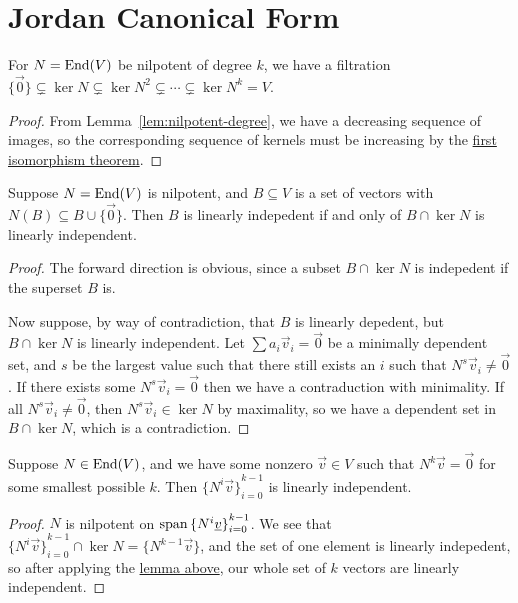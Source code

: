 \section{Jordan Canonical Form}

\begin{lemma}
    For \(N = \operatorname{End}(V)\) be nilpotent of degree \(k\),
    we have a filtration
    \(\{\vec{0}\} \subsetneq \ker N \subsetneq \ker N^2 \subsetneq \cdots \subsetneq \ker N^k = V\).
\end{lemma}
\begin{proof}
    From Lemma~\ref{lem:nilpotent-degree},
    we have a decreasing sequence of images,
    so the corresponding sequence of kernels must be increasing
    by the \hyperref[thm:iso-1-vsp]{first isomorphism theorem}.
\end{proof}
\begin{lemma}\label{lem:nilpotent-lin-indep}
    Suppose \(N = \operatorname{End}(V)\) is nilpotent,
    and \(B \subseteq V\) is a set of vectors with \(N(B) \subseteq B \cup \{\vec{0}\}\).
    Then \(B\) is linearly indepedent if and only of \(B \cap \ker N\) is linearly independent.
\end{lemma}
\begin{proof}
    The forward direction is obvious,
    since a subset \(B \cap \ker N\) is indepedent if the superset \(B\) is.

    Now suppose, by way of contradiction,
    that \(B\) is linearly depedent, but \(B \cap \ker N\) is linearly independent.
    Let \(\sum a_i\vec{v}_i = \vec{0}\) be a minimally dependent set,
    and \(s\) be the largest value such that there still exists an \(i\) such that
    \(N^s\vec{v}_i \neq \vec{0}\).
    If there exists some \(N^s\vec{v}_i = \vec{0}\)
    then we have a contraduction with minimality.
    If all \(N^s\vec{v}_i \neq \vec{0}\),
    then \(N^s\vec{v}_i \in \ker N\) by maximality,
    so we have a dependent set in \(B \cap \ker N\), which is a contradiction.
\end{proof}
\begin{corollary}
    Suppose \(N \in \operatorname{End}(V)\), and we have some nonzero \(\vec{v} \in V\)
    such that \(N^k\vec{v} = \vec{0}\) for some smallest possible \(k\).
    Then \({\{N^i\vec{v}\}}_{i=0}^{k-1}\) is linearly independent.
\end{corollary}
\begin{proof}
    \(N\) is nilpotent on \(\operatorname{span}{\{N^i\underline{v}\}}_{i=0}^{k-1}\).
    We see that \({\{N^i\vec{v}\}}_{i=0}^{k-1} \cap \ker N = \{N^{k-1}\vec{v}\}\),
    and the set of one element is linearly indepedent,
    so after applying the \hyperref[lem:nilpotent-lin-indep]{lemma above},
    our whole set of \(k\) vectors are linearly independent.
\end{proof}

